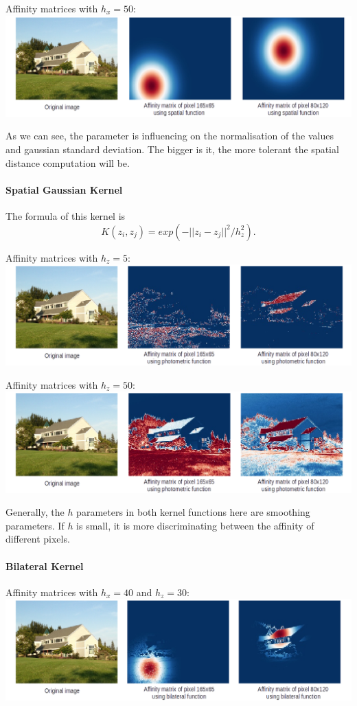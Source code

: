 Affinity matrices with \(h_x = 50\): \\
\includegraphics[width=\textwidth]{img/spatialAffinitySigma50.png}

As we can see, the parameter is influencing on the normalisation of the values and gaussian standard deviation.
The bigger is it, the more tolerant the spatial distance computation will be.

\paragraph{Spatial Gaussian Kernel}
The formula of this kernel is
\[K(z_i, z_j) = exp(-||z_i - z_j||^2 / h_z^2).\]

Affinity matrices with \(h_z = 5\): \\
\includegraphics[width=\textwidth]{img/photometricAffinitySigma5.png}

Affinity matrices with \(h_z = 50\): \\
\includegraphics[width=\textwidth]{img/photometricAffinitySigma50.png}

Generally, the \(h\) parameters in both kernel functions here are smoothing parameters.
If \(h\) is small, it is more discriminating between the affinity of different pixels.

\paragraph{Bilateral Kernel}
Affinity matrices with \(h_x = 40\) and \(h_z = 30\): \\
\includegraphics[width=\textwidth]{img/bilateralAffinitySpatial40Photo30.png}

